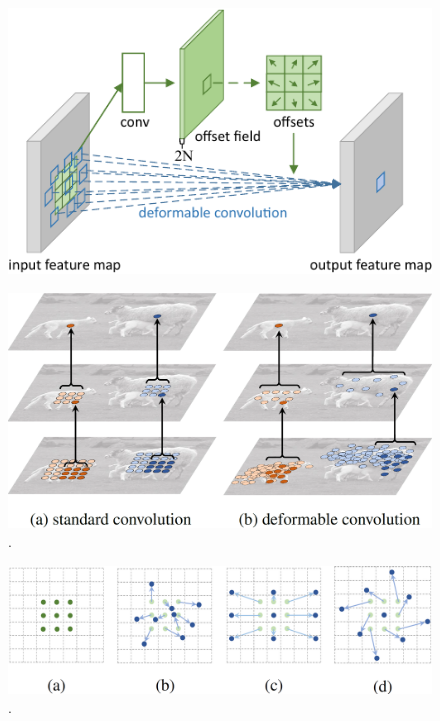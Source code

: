 \begin{figure}[t]
    \centerline{\includegraphics[width=0.6\linewidth]{figures/methodology/deformable_convolution.pdf}}
    \caption[\Gls{dcnn}]{ }
    \label{fig:DeformableCNN}
\end{figure}

\begin{figure}[t]
    \centerline{\includegraphics[width=0.6\linewidth]{figures/methodology/dcn_standard_vs_deformable.png}}
    \caption[Standard vs deformable convolution]{.}
    \label{fig:StandardVsDeformableCNN}
\end{figure}

\begin{figure}[t]
    \centerline{\includegraphics[width=0.6\linewidth]{figures/methodology/dcn_sampling_locations.png}}
    \caption[Various sampling locations in \glspl{dcnn}]{.}
    \label{fig:SamplingLocationsDeformableCNN}
\end{figure}
